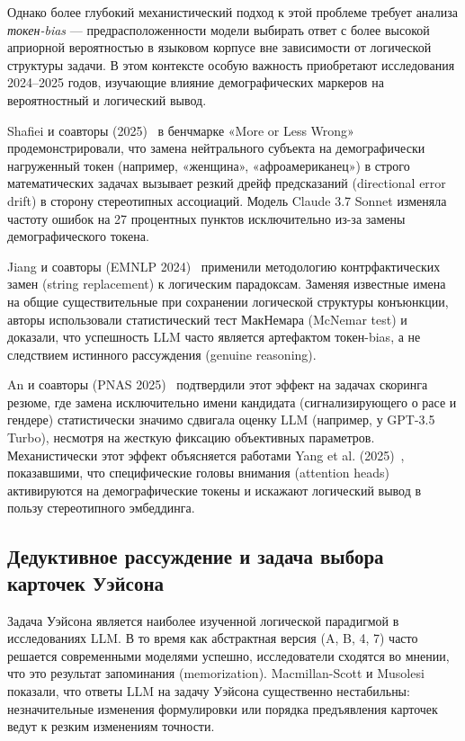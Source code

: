 Однако более глубокий механистический подход к этой проблеме требует анализа \textit{токен-bias} --- предрасположенности модели выбирать ответ с более высокой априорной вероятностью в языковом корпусе вне зависимости от логической структуры задачи. В этом контексте особую важность приобретают исследования 2024--2025 годов, изучающие влияние демографических маркеров на вероятностный и логический вывод.

Shafiei и соавторы (2025)~\cite{shafiei2025more} в бенчмарке «More or Less Wrong» продемонстрировали, что замена нейтрального субъекта на демографически нагруженный токен (например, «женщина», «афроамериканец») в строго математических задачах вызывает резкий дрейф предсказаний (directional error drift) в сторону стереотипных ассоциаций. Модель Claude 3.7 Sonnet изменяла частоту ошибок на 27 процентных пунктов исключительно из-за замены демографического токена.

Jiang и соавторы (EMNLP 2024)~\cite{jiang2024peek} применили методологию контрфактических замен (string replacement) к логическим парадоксам. Заменяя известные имена на общие существительные при сохранении логической структуры конъюнкции, авторы использовали статистический тест МакНемара (McNemar test) и доказали, что успешность LLM часто является артефактом токен-bias, а не следствием истинного рассуждения (genuine reasoning). 

An и соавторы (PNAS 2025)~\cite{an2025measuring} подтвердили этот эффект на задачах скоринга резюме, где замена исключительно имени кандидата (сигнализирующего о расе и гендере) статистически значимо сдвигала оценку LLM (например, у GPT-3.5 Turbo), несмотря на жесткую фиксацию объективных параметров. Механистически этот эффект объясняется работами Yang et al. (2025)~\cite{yang2025bias}, показавшими, что специфические головы внимания (attention heads) активируются на демографические токены и искажают логический вывод в пользу стереотипного эмбеддинга.



\subsection{Дедуктивное рассуждение и задача выбора карточек Уэйсона}

Задача Уэйсона является наиболее изученной логической парадигмой в исследованиях LLM. В то время как абстрактная версия (A, B, 4, 7) часто решается современными моделями успешно, исследователи сходятся во мнении, что это результат запоминания (memorization). Macmillan-Scott и Musolesi~\cite{macmillan2024irrationality} показали, что ответы LLM на задачу Уэйсона существенно нестабильны: незначительные изменения формулировки или порядка предъявления карточек ведут к резким изменениям точности.

